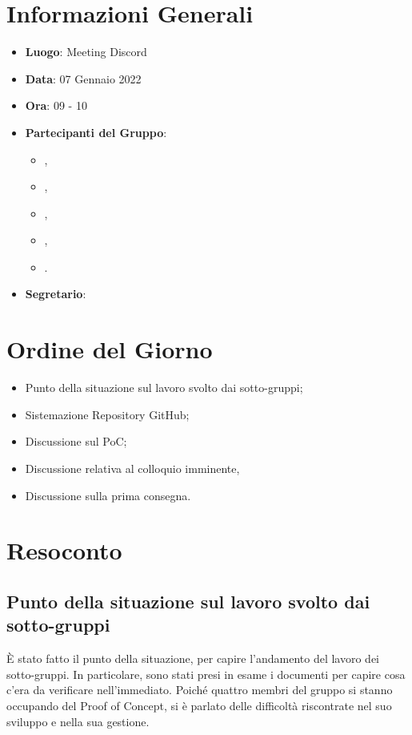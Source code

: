 \section{Informazioni Generali}

\begin{itemize}
\item{\textbf{Luogo}}: Meeting Discord
\item{\textbf{Data}}: 07 Gennaio 2022
\item{\textbf{Ora}}: 09 - 10
\item{\textbf{Partecipanti del Gruppo}}: 
	\begin{itemize}
	\item{\EP{},} 
	\item{\FP{},}
	\item{\GC{},}
	\item{\LW{},}
	\item{\MB{}.}
	\end{itemize} 
\item{\textbf{Segretario}}: \GC{}	
\end{itemize}

\section{Ordine del Giorno}
\begin{itemize}
\item{Punto della situazione sul lavoro svolto dai sotto-gruppi;}
\item{Sistemazione Repository GitHub;}
\item{Discussione sul PoC;}
\item{Discussione relativa al colloquio imminente,}
\item{Discussione sulla prima consegna.}
\end{itemize}

\section{Resoconto}

\subsection{Punto della situazione sul lavoro svolto dai sotto-gruppi}

È stato fatto il punto della situazione, per capire l'andamento del lavoro dei sotto-gruppi. In particolare, sono stati presi in esame i documenti per capire cosa c'era da verificare nell'immediato.
Poiché quattro membri del gruppo si stanno occupando del Proof of Concept, si è parlato delle difficoltà riscontrate nel suo sviluppo e nella sua gestione.     

